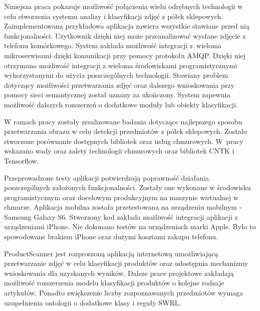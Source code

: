 Niniejsza praca pokazuje możliwość połączenia wielu odrębnych technologii w celu stworzenia systemu analizy i klasyfikacji zdjęć z półek sklepowych. Zaimplementowana przykładowa aplikacja zawiera wszystkie stawiane przed nią funkcjonalności. Użytkownik dzięki niej może przeanalizować wysłane zdjęcie z telefonu komórkowego. System zakłada możliwość integracji z~wieloma mikroserwisami dzięki komunikacji przy pomocy protokołu AMQP. Dzięki niej otrzymano możliwość integracji z wieloma środowiskami programistycznymi wykorzystanymi do użycia poszczególnych technologii. Stawiany problem dotyczący możliwości przetwarzania zdjęć oraz dalszego wnioskowania przy pomocy sieci semantycznej został uznany za ukończony. System zapewnia możliwość dalszych rozszerzeń o dodatkowe moduły lub obiekty klasyfikacji. 

W ramach pracy zostały zrealizowane badania dotyczące najlepszego sposobu przetwarzania obrazu w celu detekcji przedmiotów z półek sklepowych. Zostało stworzone porównanie dostępnych bibliotek oraz usług chmurowych. W~pracy wskazano wady oraz zalety technologii chmurowych oraz bibliotek CNTK i Tensorflow. 

Przeprowadzone testy aplikacji potwierdzają poprawność działania poszczególnych założonych funkcjonalności. Zostały one wykonane w środowisku programistycznym oraz docelowym produkcyjnym na maszynie wirtualnej w chmurze. Aplikacja mobilna została przetestowana na urządzeniu mobilnym - Samsung Galaxy S6. Stworzony kod zakłada możliwość integracji aplikacji z urządzeniami iPhone. Nie dokonano testów na urządzeniach marki Apple. Było to spowodowane brakiem iPhone oraz dużymi kosztami zakupu telefonu.

ProductScanner jest rozproszoną aplikacją internetową umożliwiającą przetwarzanie zdjęć w celu klasyfikacji produktów oraz udostępnia mechanizmy wnioskowania dla uzyskanych wyników. Dalsze prace projektowe zakładają możliwość rozszerzenia modelu klasyfikacji produktów o kolejne rodzaje artykułów. Ponadto zwiększenie liczby rozpoznawanych przedmiotów wymaga uzupełnienia ontologii o dodatkowe klasy i reguły SWRL.